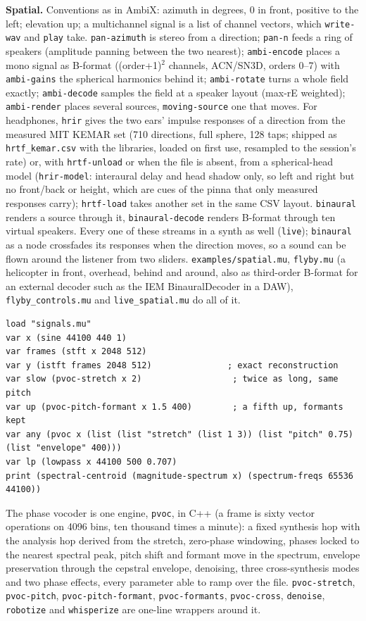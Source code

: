 \documentclass[11pt,a4paper]{article}
\newcommand{\musil}[1]{\lstinline[style=musilinline]{#1}}
\begin{document}
\textbf{Spatial.} Conventions as in AmbiX: azimuth in degrees, 0 in front, positive to
the left; elevation up; a multichannel signal is a list of channel vectors, which
\musil{write-wav} and \musil{play} take. \musil{pan-azimuth} is stereo from a direction;
\musil{pan-n} feeds a ring of speakers (amplitude panning between the two nearest);
\musil{ambi-encode} places a mono signal as B-format ((order+1)$^2$ channels, ACN/SN3D,
orders 0--7) with \musil{ambi-gains} the spherical harmonics behind it; \musil{ambi-rotate}
turns a whole field exactly; \musil{ambi-decode} samples the field at a speaker layout
(max-rE weighted); \musil{ambi-render} places several sources, \musil{moving-source} one
that moves. For headphones, \musil{hrir} gives the two ears' impulse responses of a direction from
the measured MIT KEMAR set (710 directions, full sphere, 128 taps; shipped as
\texttt{hrtf\_kemar.csv} with the libraries, loaded on first use, resampled to the
session's rate) or, with \musil{hrtf-unload} or when the file is absent, from a
spherical-head model (\musil{hrir-model}: interaural delay and head shadow only, so left
and right but no front/back or height, which are cues of the pinna that only measured
responses carry); \musil{hrtf-load} takes another set in the same CSV layout.
\musil{binaural} renders a source through it, \musil{binaural-decode} renders B-format
through ten virtual speakers. Every one of these streams in a synth as well (\musil{live});
\musil{binaural} as a node crossfades its responses when the direction moves, so a sound
can be flown around the listener from two sliders. \texttt{examples/spatial.mu},
\texttt{flyby.mu} (a helicopter in front, overhead, behind and around, also as third-order
B-format for an external decoder such as the IEM BinauralDecoder in a DAW),
\texttt{flyby\_controls.mu} and \texttt{live\_spatial.mu} do all of it.

\begin{lstlisting}
load "signals.mu"
var x (sine 44100 440 1)
var frames (stft x 2048 512)
var y (istft frames 2048 512)               ; exact reconstruction
var slow (pvoc-stretch x 2)                  ; twice as long, same pitch
var up (pvoc-pitch-formant x 1.5 400)        ; a fifth up, formants kept
var any (pvoc x (list (list "stretch" (list 1 3)) (list "pitch" 0.75) (list "envelope" 400)))
var lp (lowpass x 44100 500 0.707)
print (spectral-centroid (magnitude-spectrum x) (spectrum-freqs 65536 44100))
\end{lstlisting}

The phase vocoder is one engine, \musil{pvoc}, in C++ (a frame is sixty vector
operations on 4096 bins, ten thousand times a minute): a fixed synthesis hop with the
analysis hop derived from the stretch, zero-phase windowing, phases locked to the
nearest spectral peak, pitch shift and formant move in the spectrum, envelope
preservation through the cepstral envelope, denoising, three cross-synthesis modes and
two phase effects, every parameter able to ramp over the file. \musil{pvoc-stretch},
\musil{pvoc-pitch}, \musil{pvoc-pitch-formant}, \musil{pvoc-formants},
\musil{pvoc-cross}, \musil{denoise}, \musil{robotize} and \musil{whisperize} are
one-line wrappers around it.
\end{document}
